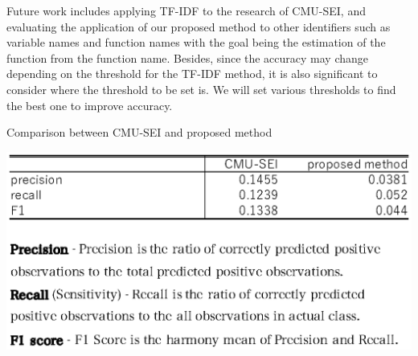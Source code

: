 \documentclass[JIP]{apris}
\begin{document}
Future work includes applying TF-IDF to the research of CMU-SEI, and evaluating the application of our proposed method to other identifiers such as variable names and function names with the goal being the estimation of the function from the function name. Besides, since the accuracy may change depending on the threshold for the TF-IDF method, it is also significant to consider where the threshold to be set is. We will set various thresholds to find the best one to improve accuracy.

\begin{table}[t]
 \centering
 \caption{Comparison between CMU-SEI and proposed method\cite{joshi2016accuracy} \cite{sasaki2007truth} }
 \includegraphics[width=1.0\hsize]{image/cmu-kyu.eps} 
 \label{table2} 
\end{table}






\end{document}
